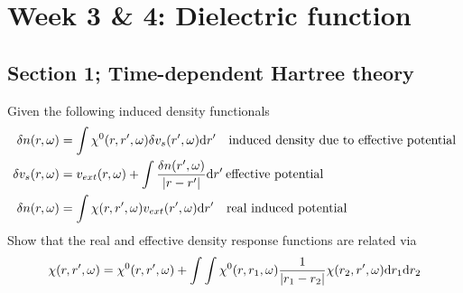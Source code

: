 \section{Week 3 \& 4: Dielectric function}
\subsection{Section 1; Time-dependent Hartree theory}
\begin{exercise}
Given the following induced density functionals
\begin{align}
    \delta n(r,\omega) &= \int \chi^{0}(r,r',\omega)\delta v_s(r',\omega)\mathrm{d}r' \quad  \text{induced density due to effective potential}\label{eq:301}\\
    \delta v_s(r,\omega) &= v_{ext}(r,\omega) + \int \dfrac{\delta n(r',\omega)}{\abs{r-r'}}\mathrm{d}r' \: \text{effective potential} \label{eq:302}\\
    \delta n(r,\omega) &= \int \chi(r,r',\omega)v_{ext}(r',\omega)\mathrm{d}r' \quad\text{real induced potential} \label{eq:303}
\end{align}
Show that the real and effective density response functions are related via
\begin{equation}
    \chi(r,r',\omega) = \chi^{0}(r,r',\omega) + \int\int \chi^{0}(r,r_1,\omega) \dfrac{1}{\abs{r_1-r_2}}\chi(r_2,r',\omega)\mathrm{d}r_1\mathrm{d}r_2
\end{equation}
\end{exercise}
